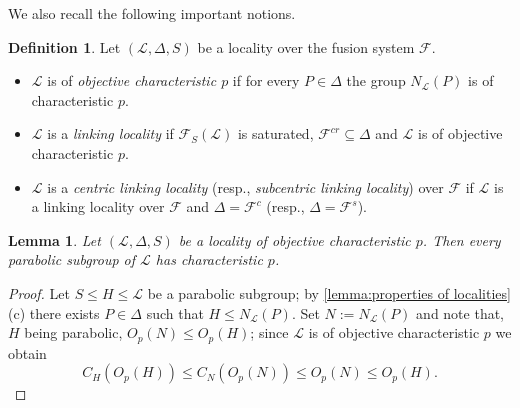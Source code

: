 \documentclass{amsart}
\numberwithin{equation}{section}
\newtheorem{lemma}[equation]{Lemma}
\theoremstyle{definition}
\newtheorem{definition}[equation]{Definition}
\theoremstyle{subresult}
\theoremstyle{caseresult}
\newcommand{\F}{\mathcal{F}}
\renewcommand{\L}{\mathcal{L}}
\newcommand{\<}{\langle}
\renewcommand{\>}{\rangle}
\begin{document}
We also recall the following important notions.
\begin{definition}\label{def:linking localities}
    Let $(\L,\Delta,S)$ be a locality over the fusion system $\F$.
    \begin{itemize}
        \item $\L$ is of \emph{objective characteristic $p$} if for every $P \in \Delta$ the group $N_\L(P)$ is of characteristic $p$.
       \item $\L$ is a \emph{linking locality} if $\F_S(\L)$ is saturated, $\F^{cr} \subseteq \Delta$ and $\L$ is of objective characteristic $p$.
       \item $\L$ is a \emph{centric linking locality} (resp., \emph{subcentric linking locality}) over $\F$ if $\L$ is a linking locality over $\F$ and $\Delta = \F^c$ (resp., $\Delta = \F^s$).
    \end{itemize}
\end{definition}

\begin{lemma}\label{lemma:parabolic implies char p}
    Let $(\L,\Delta,S)$ be a locality of objective characteristic $p$. Then every parabolic subgroup of $\L$ has characteristic $p$.
\end{lemma}
\begin{proof}
    Let $S \le H \le \L$ be a parabolic subgroup; by \ref{lemma:properties of localities}(c) there exists $P \in \Delta$ such that $H \le N_\L(P)$. Set $N:=N_\L(P)$ and note that, $H$ being parabolic, $O_p(N) \le O_p(H)$; since $\L$ is of objective characteristic $p$ we obtain
    \[
        C_H(O_p(H)) \le C_N(O_p(N)) \le O_p(N) \le O_p(H).
    \]
\end{proof}
\end{document}
